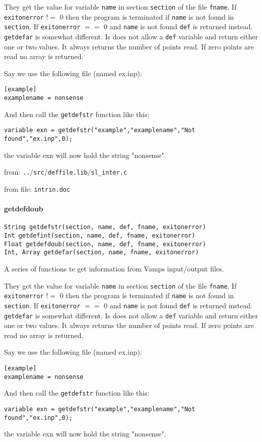 They get the value for variable {\tt name} in section {\tt section}
of the file {\tt fname}. If {\tt exitonerror} !$=$ 0 then the
program is terminated if {\tt name} is not found in {\tt section}.
If {\tt exitonerror} $=$$=$ 0 and {\tt name} is not found {\tt def} is
returned instead.
{\tt getdefar} is somewhat different. Is does not allow a {\tt def}
variable and return either one or two values. It always returns
the number of points read. If zero
points are read no array is returned.


Say we use the following file (named ex.inp):
\begin{verbatim}
[example]
examplename = nonsense
\end{verbatim}
And then call the {\tt getdefstr} function like this:
\begin{verbatim}
variable exn = getdefstr("example","examplename","Not found","ex.inp",0);
\end{verbatim}
the variable exn will now hold the string "nonsense".


from: {\tt ..$/$src$/$deffile.lib$/$sl\_inter.c}

from file: {\tt intrin.doc}


\paragraph{getdefdoub}
\begin{verbatim}
String getdefstr(section, name, def, fname, exitonerror)
Int getdefint(section, name, def, fname, exitonerror)
Float getdefdoub(section, name, def, fname, exitonerror)
Int, Array getdefar(section, name, fname, exitonerror)
\end{verbatim}
A series of functions te get information from Vamps input$/$output files.


They get the value for variable {\tt name} in section {\tt section}
of the file {\tt fname}. If {\tt exitonerror} !$=$ 0 then the
program is terminated if {\tt name} is not found in {\tt section}.
If {\tt exitonerror} $=$$=$ 0 and {\tt name} is not found {\tt def} is
returned instead.
{\tt getdefar} is somewhat different. Is does not allow a {\tt def}
variable and return either one or two values. It always returns
the number of points read. If zero
points are read no array is returned.


Say we use the following file (named ex.inp):
\begin{verbatim}
[example]
examplename = nonsense
\end{verbatim}
And then call the {\tt getdefstr} function like this:
\begin{verbatim}
variable exn = getdefstr("example","examplename","Not found","ex.inp",0);
\end{verbatim}
the variable exn will now hold the string "nonsense".


